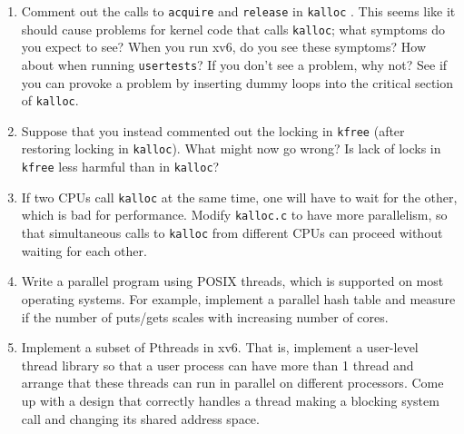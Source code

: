 \begin{enumerate}
  
\item Comment out the calls to
\lstinline{acquire}
and
\lstinline{release}
in
\lstinline{kalloc}
.
This seems like it should cause problems for
kernel code that calls
\lstinline{kalloc};
what symptoms do you expect to see?
When you run xv6, do you see these symptoms?
How about when running
\lstinline{usertests}?
If you don't see a problem, why not?
See if you can provoke a problem by inserting
dummy loops into the critical section of
\lstinline{kalloc}.

\item Suppose that you instead commented out the
locking in
\lstinline{kfree} 
(after restoring locking in
\lstinline{kalloc}).
What might now go wrong? Is lack of locks in
\lstinline{kfree}
less harmful than in
\lstinline{kalloc}?

\item If two CPUs call
\lstinline{kalloc}
at the same time, one will have to wait for the other,
which is bad for performance.
Modify 
\lstinline{kalloc.c}
to have more parallelism, so that simultaneous
calls to
\lstinline{kalloc}
from different CPUs can proceed without waiting for each other.

\item Write a parallel program using POSIX threads, which is supported on most
operating systems. For example, implement a parallel hash table and measure if
the number of puts/gets scales with increasing number of cores.

\item Implement a subset of Pthreads in xv6.  That is, implement a user-level
thread library so that a user process can have more than 1 thread and arrange
that these threads can run in parallel on different processors.  Come up with a
design that correctly handles a thread making a blocking system call and
changing its shared address space.

\end{enumerate}

